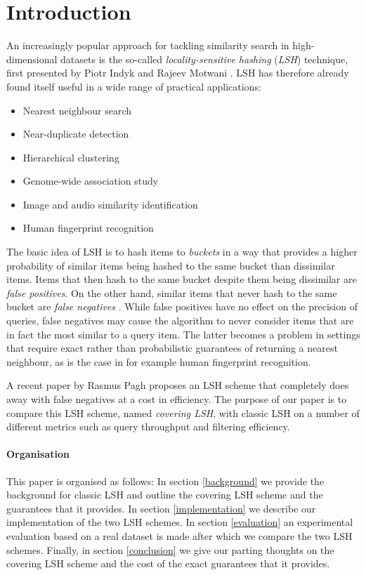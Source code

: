 \section{Introduction}
\label{introduction}

An increasingly popular approach for tackling similarity search in high-dimensional datasets is the so-called \textit{locality-sensitive hashing} (\textit{LSH}) technique, first presented by Piotr Indyk and Rajeev Motwani \cite{DBLP:conf/stoc/IndykM98}. LSH has therefore already found itself useful in a wide range of practical applications:

\begin{itemize}
  \item Nearest neighbour search
  \item Near-duplicate detection
  \item Hierarchical clustering
  \item Genome-wide association study
  \item Image and audio similarity identification
  \item Human fingerprint recognition
\end{itemize}

The basic idea of LSH is to hash items to \textit{buckets} in a way that provides a higher probability of similar items being hashed to the same bucket than dissimilar items. Items that then hash to the same bucket despite them being dissimilar are \textit{false positives}. On the other hand, similar items that never hash to the same bucket are \textit{false negatives} \cite[p. 88]{DBLP:books/cu/LeskovecRU14}. While false positives have no effect on the precision of queries, false negatives may cause the algorithm to never consider items that are in fact the most similar to a query item. The latter becomes a problem in settings that require exact rather than probabilistic guarantees of returning a nearest neighbour, as is the case in for example human fingerprint recognition.

A recent paper by Rasmus Pagh \cite{DBLP:journals/corr/Pagh15} proposes an LSH scheme that completely does away with false negatives at a cost in efficiency. The purpose of our paper is to compare this LSH scheme, named \textit{covering LSH}, with classic LSH on a number of different metrics such as query throughput and filtering efficiency.

\paragraph{Organisation} This paper is organised as follows: In section \ref{background} we provide the background for classic LSH and outline the covering LSH scheme and the guarantees that it provides. In section \ref{implementation} we describe our implementation of the two LSH schemes. In section \ref{evaluation} an experimental evaluation based on a real dataset is made after which we compare the two LSH schemes. Finally, in section \ref{conclusion} we give our parting thoughts on the covering LSH scheme and the cost of the exact guarantees that it provides.
